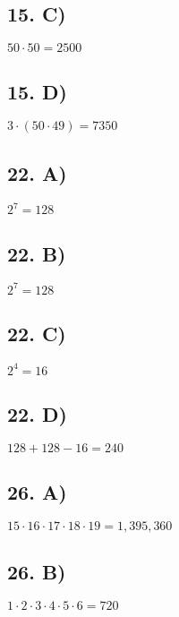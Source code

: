 \documentclass[12]{scrartcl}
\begin{document}
\subsection*{15. C)}
$50 \cdot 50 = 2500$
\subsection*{15. D)}
$3 \cdot (50 \cdot 49) = 7350$
\subsection*{22. A)}
$2^7 = 128$
\subsection*{22. B)}
$2^7 = 128$
\subsection*{22. C)}
$2^4 = 16$
\subsection*{22. D)}
$128 + 128 - 16 = 240$
\subsection*{26. A)}
$15 \cdot 16 \cdot 17 \cdot 18 \cdot 19 = 1,395,360$
\subsection*{26. B)}
$1 \cdot 2 \cdot 3 \cdot 4 \cdot 5 \cdot 6 = 720$
\end{document}
